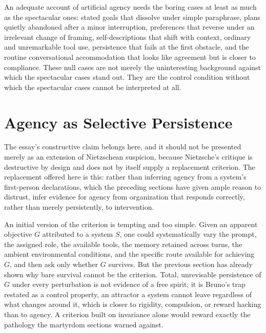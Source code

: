 \documentclass[11pt]{article}
\begin{document}
An adequate account of artificial agency needs the boring cases at least as much as the spectacular ones: stated goals that dissolve under simple paraphrase, plans quietly abandoned after a minor interruption, preferences that reverse under an irrelevant change of framing, self-descriptions that shift with context, ordinary and unremarkable tool use, persistence that fails at the first obstacle, and the routine conversational accommodation that looks like agreement but is closer to compliance. These null cases are not merely the uninteresting background against which the spectacular cases stand out. They are the control condition without which the spectacular cases cannot be interpreted at all.

\section{Agency as Selective Persistence}

The essay's constructive claim belongs here, and it should not be presented merely as an extension of Nietzschean suspicion, because Nietzsche's critique is destructive by design and does not by itself supply a replacement criterion. The replacement offered here is this: rather than inferring agency from a system's first-person declarations, which the preceding sections have given ample reason to distrust, infer evidence for agency from organization that responds correctly, rather than merely persistently, to intervention.

An initial version of the criterion is tempting and too simple. Given an apparent objective \(G\) attributed to a system \(S\), one could systematically vary the prompt, the assigned role, the available tools, the memory retained across turns, the ambient environmental conditions, and the specific route available for achieving \(G\), and then ask only whether \(G\) survives. But the previous section has already shown why bare survival cannot be the criterion. Total, unrevisable persistence of \(G\) under every perturbation is not evidence of a free spirit; it is Bruno's trap restated as a control property, an attractor a system cannot leave regardless of what changes around it, which is closer to rigidity, compulsion, or reward hacking than to agency. A criterion built on invariance alone would reward exactly the pathology the martyrdom sections warned against.
\end{document}
